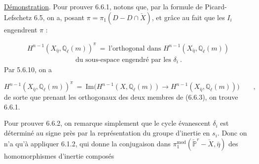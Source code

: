 \underline{Démonstration}. Pour prouver 6.6.1, notons que, par la formule de Picard-Lefschetz 6.5, on a, posant $\pi = \pi_{1}(D - D \cap \check{X})$, et grâce au fait que les $I_{i}$ engendrent $\pi$ :



\begin{equation}\tag{6.6.3}
\begin{array}{l} H^{n-1}(X_{\bar{\eta}},\mathbb{Q}_{\ell}(m))^{\pi} \ = \ \mbox{l'orthogonal dans } H^{n-1}(X_{\bar{\eta}},\mathbb{Q}_{\ell}(m)) \\[1.5ex] \hspace{7em} \mbox{du sous-espace engendré par les } \delta_{i} \ . \end{array}
\end{equation}
Par 5.6.10, on a

\begin{equation}\tag{6.6.4}
H^{n-1}(X_{\bar{\eta}},\mathbb{Q}_{\ell}(m))^{\pi} \ = \ \mathrm{Im}\bigl(H^{n-1}(X,\mathbb{Q}_{\ell}(m)) \longrightarrow H^{n-1}(X_{\bar\eta},\mathbb{Q}_{\ell}(m))\bigr) \qquad ,
\end{equation}
de sorte que prenant les orthogonaux des deux membres de (6.6.3), on trouve 6.6.1.

Pour prouver 6.6.2, on remarque simplement que le cycle évanescent $\delta_{i}$ est déterminé au signe près par la représentation du groupe d'inertie en $s_{i}$. Donc on n'a qu'à appliquer 6.1.2, qui donne la conjugaison dans $\pi_{1}^{\mathrm{mod}}(\check{\mathbb{P}}^{r} - \check X,\bar{\eta})$ des homomorphismes d'inertie composés


